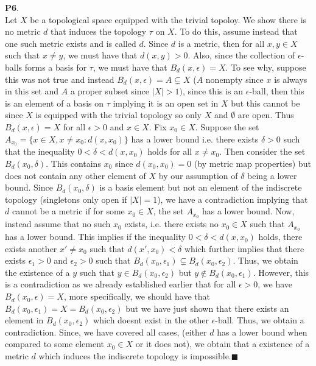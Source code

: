 \documentclass{article}
\begin{document}
    \textbf{P6}.\\
    Let $X$ be a topological space equipped with the trivial topoloy. We show there is no metric $d$ that induces the topology $\tau$ on $X$. To do this, assume
    instead that one such metric exists and is called $d$. Since $d$ is a metric, then for all $x,y\in X$ such that $x\neq y$, we must have that
    $d(x,y)>0$. Also, since the collection of $\epsilon$-balls forms a basis for $\tau$, we must have that $B_d(x,\epsilon) = X$. To see why, suppose this was not
    true and instead $B_d(x,\epsilon) = A\subsetneq X$ ($A$ nonempty since $x$ is always in this set and $A$ a proper subset since $|X|>1)$, 
    since this is an $\epsilon$-ball, then this is an element of
    a basis on $\tau$ implying it is an open set in $X$ but this cannot be since $X$ is equipped with the trivial topology so only $X$ and $\emptyset$ are open.
    Thus $B_d(x,\epsilon)=X$ for all $\epsilon>0$ and $x\in X$. Fix $x_0\in X$. Suppose the set $A_{x_0} = \{x\in X, x\neq x_0: d(x,x_0)\}$ has a lower bound i.e.
    there exists $\delta>0$ such that the inequality $0 < \delta < d(x,x_0)$ holds for all $x\neq x_0$. Then consider the set $B_d(x_0,\delta)$. This contains
    $x_0$ since $d(x_0,x_0)=0$ (by metric map properties) but does not contain any other element of $X$ by our assumption of $\delta$ being a lower bound. Since
    $B_d(x_0,\delta)$ is a basis element but not an element of the indiscrete topology (singletons only open if $|X|=1$), we have a contradiction implying 
    that $d$ cannot be a metric if for some
    $x_0\in X$, the set $A_{x_0}$ has a lower bound. Now, instead assume that no such $x_0$ exists, i.e. there exists no $x_0\in X$ such that $A_{x_0}$ has a lower
    bound. This implies if the inequality $0<\delta<d(x,x_0)$ holds, there exists another $x'\neq x_0$ such that $d(x',x_0)<\delta$ which further implies that
    there exists $\epsilon_1>0$ and $\epsilon_2>0$ such that $B_d(x_0,\epsilon_1)\subsetneq B_d(x_0,\epsilon_2)$. Thus, we obtain the existence of a $y$ such that
    $y\in B_d(x_0,\epsilon_2)$ but $y\not\in B_d(x_0,\epsilon_1)$. However, this is a contradiction as we already established earlier that for all $\epsilon>0$, we
    have $B_d(x_0,\epsilon)=X$, more specifically, we should have that $B_d(x_0,\epsilon_1) = X = B_d(x_0,\epsilon_2)$ but we have just shown that there exists
    an element in $B_d(x_0,\epsilon_2)$ which doesnt exist in the other $\epsilon$-ball. Thus, we obtain a contradiction. Since, we have covered all cases,
    (either $d$ has a lower bound when compared to some element $x_0\in X$ or it does not), we obtain that a existence of a metric $d$ which induces the 
    indiscrete topology is impossible.\hfill$\blacksquare$\\
\end{document}

